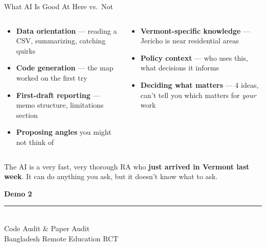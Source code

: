 \documentclass[aspectratio=169, 10pt]{beamer}
\begin{document}
\begin{frame}{What AI Is Good At Here vs.\ Not}
\vskip-4pt
\begin{columns}[T]
\begin{column}{0.47\textwidth}
\begin{tcolorbox}[keybox, title={\faCheck\quad AI Strengths}, top=3pt, bottom=3pt]
\small
\begin{itemize}\setlength{\itemsep}{2pt}
  \item \textbf{Data orientation} --- reading a CSV, summarizing, catching quirks
  \item \textbf{Code generation} --- the map worked on the first try
  \item \textbf{First-draft reporting} --- memo structure, limitations section
  \item \textbf{Proposing angles} you might not think of
\end{itemize}
\end{tcolorbox}
\end{column}
\begin{column}{0.47\textwidth}
\begin{tcolorbox}[colback=SoftCoral!8, colframe=SoftCoral, boxrule=0.8pt, arc=3pt,
  left=6pt, right=6pt, top=3pt, bottom=3pt,
  fonttitle=\bfseries\small\color{white}, coltitle=white, colbacktitle=SoftCoral,
  title={\faTimes\quad Still Needs You}]
\small
\begin{itemize}\setlength{\itemsep}{2pt}
  \item \textbf{Vermont-specific knowledge} --- Jericho is near residential areas
  \item \textbf{Policy context} --- who uses this, what decisions it informs
  \item \textbf{Deciding what matters} --- 4 ideas, can't tell you which matters for \textit{your} work
\end{itemize}
\end{tcolorbox}
\end{column}
\end{columns}
\vskip4pt
\begin{tcolorbox}[quotebox, width=12cm]
\small The AI is a very fast, very thorough RA who \textbf{just arrived in Vermont last week}. It can do anything you ask, but it doesn't know what to ask.
\end{tcolorbox}
\end{frame}

{
\begin{frame}
\centering\vfill
{\fontsize{22}{28}\bfseries\selectfont\color{white} Demo 2}\\[6pt]
{\color{UVMGold}\rule{5cm}{0.8pt}}\\[6pt]
{\normalsize\color{UVMGold} Code Audit \& Paper Audit}\\[4pt]
{\small\color{PaleSage} Bangladesh Remote Education RCT}
\vfill
\end{frame}
}
\end{document}
